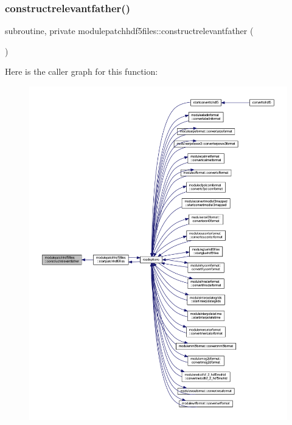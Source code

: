\subsubsection{\texorpdfstring{constructrelevantfather()}{constructrelevantfather()}}
{\footnotesize\ttfamily subroutine, private modulepatchhdf5files\+::constructrelevantfather (\begin{DoxyParamCaption}{ }\end{DoxyParamCaption})\hspace{0.3cm}{\ttfamily [private]}}

Here is the caller graph for this function\+:\nopagebreak
\begin{figure}[H]
\begin{center}
\leavevmode
\includegraphics[width=350pt]{namespacemodulepatchhdf5files_a737940e59c6035bed94366c5f2116a1b_icgraph}
\end{center}
\end{figure}
\mbox{\label{namespacemodulepatchhdf5files_afdb5da0b3386fdd4fe2905c0bc1c4d09}} 

